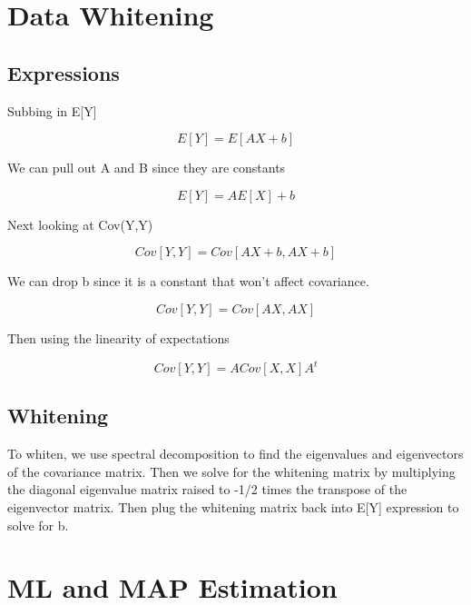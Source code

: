 \documentclass{article}
\begin{document}
\section{Data Whitening}

\subsection{Expressions}

Subbing in E[Y]

\[E[Y] = E[AX + b]\]

We can pull out A and B since they are constants

\[E[Y] = AE[X] + b\]

Next looking at Cov(Y,Y)

\[Cov[Y,Y] = Cov[AX+b,AX+b]\]

We can drop b since it is a constant that won't affect covariance.

\[Cov[Y,Y] = Cov[AX,AX]\]

Then using the linearity of expectations

\[Cov[Y,Y] = ACov[X,X]A^t\]

\subsection{Whitening}
To whiten, we use spectral decomposition to find the eigenvalues and eigenvectors of the covariance matrix. Then we solve for the whitening matrix by multiplying the diagonal eigenvalue matrix raised to -1/2 times the transpose of the eigenvector matrix. Then plug the whitening matrix back into E[Y] expression to solve for b.

\newpage
\section{ML and MAP Estimation}

\subsection{}
\subsection{}
\subsection{}
\end{document}
